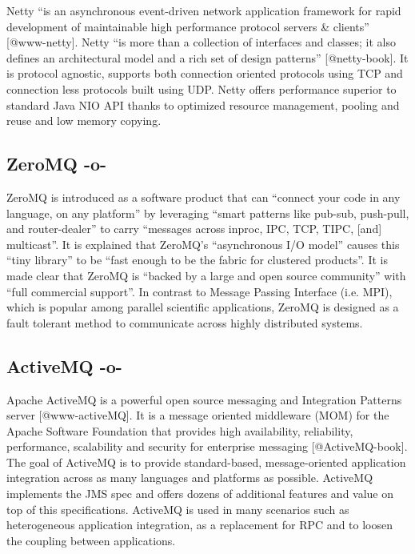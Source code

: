 Netty ``is an asynchronous event-driven network application framework
for rapid development of maintainable high performance protocol
servers \& clients'' [@www-netty]. Netty ``is more than a
collection of interfaces and classes; it also defines an architectural
model and a rich set of design patterns'' [@netty-book]. It is
protocol agnostic, supports both connection oriented protocols using
TCP and connection less protocols built using UDP. Netty offers
performance superior to standard Java NIO API thanks to optimized
resource management, pooling and reuse and low memory copying.


     
\subsection{ZeroMQ -o-}

     ZeroMQ is introduced as a software product
     that can ``connect your code in any language, on any platform'' by 
     leveraging ``smart patterns like pub-sub, push-pull, and 
     router-dealer'' to carry ``messages across inproc, IPC, TCP, TIPC, 
     [and] multicast''\cite{www-zeromq}. It is explained that
     ZeroMQ's ``asynchronous I/O model'' causes this ``tiny library'' to 
     be ``fast enough to be the fabric for clustered products''\cite{www-zeromq2}.
     It is made clear that ZeroMQ is ``backed by a
     large and open source community'' with ``full commercial
     support''\cite{www-zeromq}.
     In contrast to Message Passing Interface (i.e. MPI), which is 
     popular among parallel scientific applications, ZeroMQ is 
     designed as a fault tolerant method to communicate across highly 
     distributed systems.



\subsection{ActiveMQ -o-}

Apache ActiveMQ is a powerful open source messaging and Integration
Patterns server [@www-activeMQ]. It is a message oriented
middleware (MOM) for the Apache Software Foundation that provides high
availability, reliability, performance, scalability and security for
enterprise messaging [@ActiveMQ-book]. The goal of ActiveMQ is to
provide standard-based, message-oriented application integration
across as many languages and platforms as possible. ActiveMQ
implements the JMS spec and offers dozens of additional features and
value on top of this specifications. ActiveMQ is used in many
scenarios such as heterogeneous application integration, as a
replacement for RPC and to loosen the coupling between applications.
     
